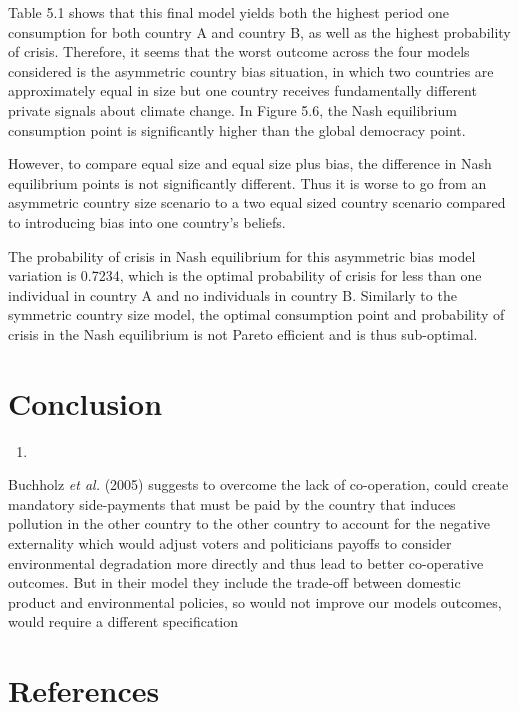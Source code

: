 \documentclass[11pt,preprint, authoryear]{elsarticle}
\numberwithin{equation}{section}
\numberwithin{figure}{section}
\numberwithin{table}{section}
\def\tightlist{} %
\begin{document}
Table 5.1 shows that this final model yields both the highest period one
consumption for both country A and country B, as well as the highest
probability of crisis. Therefore, it seems that the worst outcome across
the four models considered is the asymmetric country bias situation, in
which two countries are approximately equal in size but one country
receives fundamentally different private signals about climate change.
In Figure 5.6, the Nash equilibrium consumption point is significantly
higher than the global democracy point.

However, to compare equal size and equal size plus bias, the difference
in Nash equilibrium points is not significantly different. Thus it is
worse to go from an asymmetric country size scenario to a two equal
sized country scenario compared to introducing bias into one country's
beliefs.

The probability of crisis in Nash equilibrium for this asymmetric bias
model variation is 0.7234, which is the optimal probability of crisis
for less than one individual in country A and no individuals in country
B. Similarly to the symmetric country size model, the optimal
consumption point and probability of crisis in the Nash equilibrium is
not Pareto efficient and is thus sub-optimal.

\hypertarget{conclusion}{%
\section{Conclusion}\label{conclusion}}

\begin{enumerate}
\def\labelenumi{(\arabic{enumi})}
\setcounter{enumi}{799}
\tightlist
\item
\end{enumerate}

Buchholz \emph{et al.} (2005) suggests to overcome the lack of
co-operation, could create mandatory side-payments that must be paid by
the country that induces pollution in the other country to the other
country to account for the negative externality which would adjust
voters and politicians payoffs to consider environmental degradation
more directly and thus lead to better co-operative outcomes. But in
their model they include the trade-off between domestic product and
environmental policies, so would not improve our models outcomes, would
require a different specification

\newpage

\hypertarget{references}{%
\section*{References}\label{references}}
\end{document}
